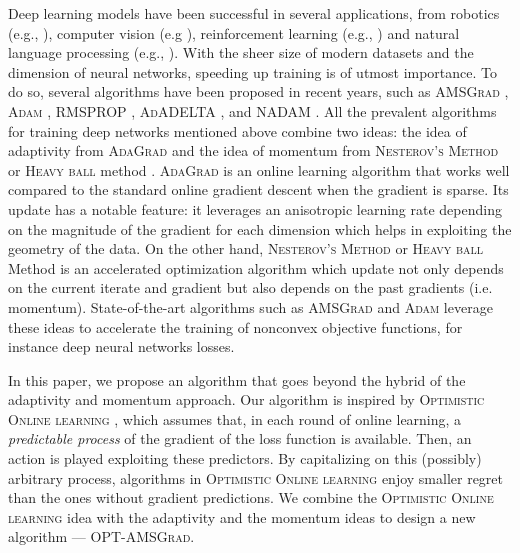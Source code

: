 \documentclass[twoside]{article}
\begin{document}
Deep learning models have been successful in several applications, from robotics (e.g., \citep{LFDA17}), computer vision (e.g \citep{Rnet16,goodfellow2014generative}), reinforcement learning (e.g., \citep{Atari13}) and natural language processing (e.g., \citep{GMH13}).
With the sheer size of modern datasets and the dimension of neural networks, speeding up training is of utmost importance.
To do so, several algorithms have been proposed in recent years, such as  \textsc{AMSGrad} \citep{RKK18}, \textsc{Adam} \citep{KB15}, \textsc{RMSPROP} \citep{TH12}, \textsc{AdADELTA} \citep{Z12}, and \textsc{NADAM} \citep{D16}.
All the prevalent algorithms for training deep networks mentioned above combine two ideas: the idea of adaptivity from \textsc{AdaGrad} \citep{DHS11,MS10} and the idea of momentum from \textsc{Nesterov's Method} \citep{N04} or \textsc{Heavy ball} method \citep{P64}.
\textsc{AdaGrad} is an online learning algorithm that works well compared to the standard online gradient descent when the gradient is sparse.
Its update has a notable feature: it leverages an anisotropic learning rate depending on the magnitude of the gradient for each dimension which helps in exploiting the geometry of the data. 
On the other hand, \textsc{Nesterov's Method} or \textsc{Heavy ball} Method \citep{P64} is an accelerated optimization algorithm which update not only depends on the current iterate and gradient but also depends on the past gradients (i.e. momentum). 
State-of-the-art algorithms such as \textsc{AMSGrad} \citep{RKK18} and \textsc{Adam} \citep{KB15} leverage these ideas to accelerate the training of nonconvex objective functions, for instance deep neural networks losses.

In this paper, we propose an algorithm that goes beyond the hybrid of the adaptivity and momentum approach. 
Our algorithm is inspired by \textsc{Optimistic Online learning} \citep{CJ12,RS13b,SALS15,ALLW18,mertikopoulos2018optimistic}, which assumes that, in each round of online learning, a \emph{predictable process} of the gradient of the loss function is available. 
Then, an action is played exploiting these predictors. 
By capitalizing on this (possibly) arbitrary process, algorithms in \textsc{Optimistic Online learning} enjoy smaller regret than the ones without gradient predictions.
We combine the \textsc{Optimistic Online learning} idea with the adaptivity and the momentum ideas to design a new algorithm --- \textsc{OPT-AMSGrad}. 
\end{document}
